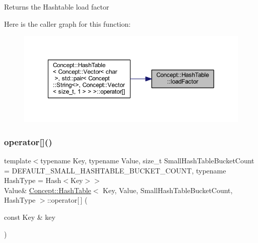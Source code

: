 \begin{DoxyReturn}{Returns}
the Hashtable load factor 
\end{DoxyReturn}
Here is the caller graph for this function\+:\nopagebreak
\begin{figure}[H]
\begin{center}
\leavevmode
\includegraphics[width=350pt]{class_concept_1_1_hash_table_a6211e9857610c29fb0665177e3d365e8_icgraph}
\end{center}
\end{figure}
\mbox{\label{class_concept_1_1_hash_table_a4172a9c3b5c528b5d0b79b1c58ab2baf}} 
\subsubsection{\texorpdfstring{operator[]()}{operator[]()}}
{\footnotesize\ttfamily template$<$typename Key, typename Value, size\+\_\+t Small\+Hash\+Table\+Bucket\+Count = D\+E\+F\+A\+U\+L\+T\+\_\+\+S\+M\+A\+L\+L\+\_\+\+H\+A\+S\+H\+T\+A\+B\+L\+E\+\_\+\+B\+U\+C\+K\+E\+T\+\_\+\+C\+O\+U\+NT, typename Hash\+Type = Hash$<$\+Key$>$$>$ \\
Value\& \mbox{\hyperlink{class_concept_1_1_hash_table}{Concept\+::\+Hash\+Table}}$<$ Key, Value, Small\+Hash\+Table\+Bucket\+Count, Hash\+Type $>$\+::operator\mbox{[}$\,$\mbox{]} (\begin{DoxyParamCaption}\item[{const Key \&}]{key }\end{DoxyParamCaption})\hspace{0.3cm}{\ttfamily [inline]}}

